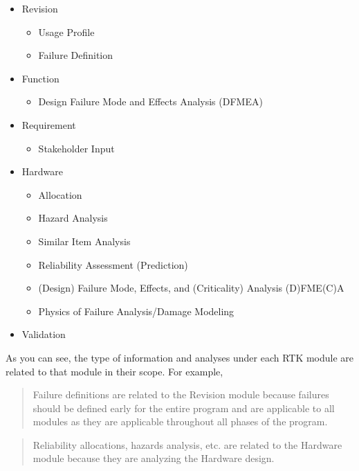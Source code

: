 \documentclass[twoside,12pt,letterpaper,openright]{book}
\begin{document}
\begin{itemize}
    \item Revision
        \begin{itemize}
            \item Usage Profile
            \item Failure Definition
        \end{itemize}
    \item Function
        \begin{itemize}
            \item Design Failure Mode and Effects Analysis (DFMEA)
        \end{itemize}
    \item Requirement
        \begin{itemize}
            \item Stakeholder Input
        \end{itemize}
    \item Hardware
        \begin{itemize}
            \item Allocation
            \item Hazard Analysis
            \item Similar Item Analysis
            \item Reliability Assessment (Prediction)
            \item (Design) Failure Mode, Effects, and (Criticality) Analysis (D)FME(C)A
            \item Physics of Failure Analysis/Damage Modeling
        \end{itemize}
    \item Validation
\end{itemize}

\noindent As you can see, the type of information and analyses under each RTK
module are related to that module in their scope.  For example,

\begin{quote}
Failure definitions are related to the Revision module because failures should
be defined early for the entire program and are applicable to all modules as
they are applicable throughout all phases of the program.
\end{quote}

\begin{quote}
Reliability allocations, hazards analysis, etc. are related to the Hardware
module because they are analyzing the Hardware design.
\end{quote}
\end{document}
